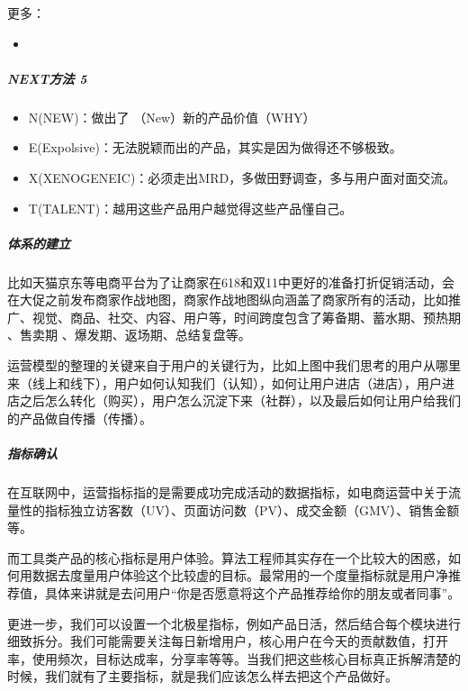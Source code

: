 \documentclass[letterpaper,11pt,english]{sphinxmanual}
\begin{document}
更多：
\begin{itemize}
\item {} 

\end{itemize}


\subparagraph{NEXT方法 5\sphinxfootnotemark[398]}
\label{\detokenize{chapter_idea/GTM:next-5}}%
\begin{footnotetext}[398]\sphinxAtStartFootnote
{}
%
\end{footnotetext}\ignorespaces \begin{itemize}
\item {} 
N(NEW)：做出了 （New）新的产品价值（WHY）

\item {} 
E(Expolsive)：无法脱颖而出的产品，其实是因为做得还不够极致。

\item {} 
X(XENOGENEIC)：必须走出MRD，多做田野调查，多与用户面对面交流。

\item {} 
T(TALENT)：越用这些产品用户越觉得这些产品懂自己。

\end{itemize}


\subparagraph{体系的建立}
\label{\detokenize{chapter_idea/GTM:id13}}
比如天猫京东等电商平台为了让商家在618和双11中更好的准备打折促销活动，会在大促之前发布商家作战地图，商家作战地图纵向涵盖了商家所有的活动，比如推广、视觉、商品、社交、内容、用户等，时间跨度包含了筹备期、蓄水期、预热期
、售卖期 、爆发期、返场期、总结复盘等。

运营模型的整理的关键来自于用户的关键行为，比如上图中我们思考的用户从哪里来（线上和线下），用户如何认知我们（认知），如何让用户进店（进店），用户进店之后怎么转化（购买），用户怎么沉淀下来（社群），以及最后如何让用户给我们的产品做自传播（传播）。


\subparagraph{指标确认}
\label{\detokenize{chapter_idea/GTM:id14}}
在互联网中，运营指标指的是需要成功完成活动的数据指标，如电商运营中关于流量性的指标独立访客数（UV）、页面访问数（PV）、成交金额（GMV）、销售金额等。

而工具类产品的核心指标是用户体验。算法工程师其实存在一个比较大的困惑，如何用数据去度量用户体验这个比较虚的目标。最常用的一个度量指标就是用户净推荐值，具体来讲就是去问用户“你是否愿意将这个产品推荐给你的朋友或者同事”。

更进一步，我们可以设置一个北极星指标，例如产品日活，然后结合每个模块进行细致拆分。我们可能需要关注每日新增用户，核心用户在今天的贡献数值，打开率，使用频次，目标达成率，分享率等等。当我们把这些核心目标真正拆解清楚的时候，我们就有了主要指标，就是我们应该怎么样去把这个产品做好。
\end{document}
